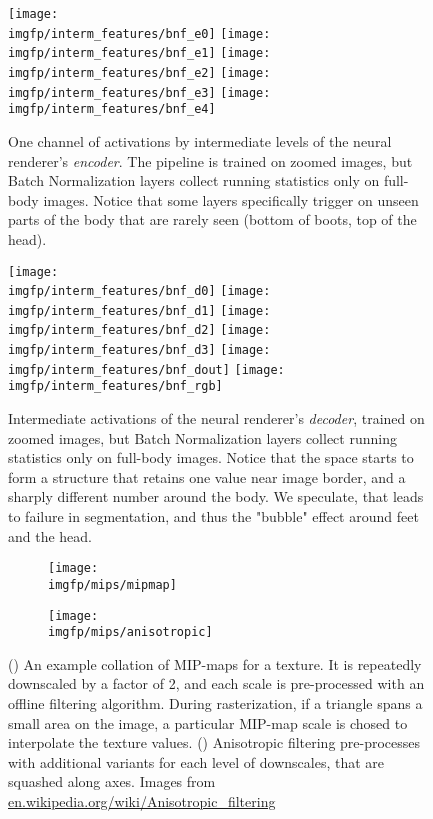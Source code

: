 \begin{figure}
	\centering
	\texttt{[image: \\imgfp/interm\_features/bnf\_e0]}%
	\hfill\texttt{[image: \\imgfp/interm\_features/bnf\_e1]}%
	\hfill\texttt{[image: \\imgfp/interm\_features/bnf\_e2]}%
	\hfill\texttt{[image: \\imgfp/interm\_features/bnf\_e3]}%
	\hfill\texttt{[image: \\imgfp/interm\_features/bnf\_e4]}%
	\caption{One channel of activations by intermediate levels of the neural renderer's \textit{encoder}. The pipeline is trained on zoomed images, but Batch Normalization layers collect running statistics only on full-body images. Notice that some layers specifically trigger on unseen parts of the body that are rarely seen (bottom of boots, top of the head).}
	\label{fig:interm06_encoder}
\end{figure}
\begin{figure}
	\centering
	\texttt{[image: \\imgfp/interm\_features/bnf\_d0]}%
	\hfill\texttt{[image: \\imgfp/interm\_features/bnf\_d1]}%
	\hfill\texttt{[image: \\imgfp/interm\_features/bnf\_d2]}%
	\hfill\texttt{[image: \\imgfp/interm\_features/bnf\_d3]}%
	\hfill\texttt{[image: \\imgfp/interm\_features/bnf\_dout]}%
	\hfill\texttt{[image: \\imgfp/interm\_features/bnf\_rgb]}%
	\caption{Intermediate activations of the neural renderer's \textit{decoder}, trained on zoomed images, but Batch Normalization layers collect running statistics only on full-body images. Notice that the space starts to form a structure that retains one value near image border, and a sharply different number around the body. We speculate, that leads to failure in segmentation, and thus the "bubble" effect around feet and the head. }
	\label{fig:interm06_decoder}
\end{figure}
\begin{figure}
	\centering
	\begin{subfigure}[b]{0.48\textwidth}
		\centering
		\texttt{[image: \\imgfp/mips/mipmap]}%
		\caption{}
		\label{fig:mipmap}
	\end{subfigure}
	\hfill
	\begin{subfigure}[b]{0.48\textwidth}
		\centering
		\texttt{[image: \\imgfp/mips/anisotropic]}
		\caption{}
		\label{fig:anisotropic}
	\end{subfigure}
	\caption{(\protect{}) An example collation of MIP-maps for a texture. It is repeatedly downscaled by a factor of 2, and each scale is pre-processed with an offline filtering algorithm. During rasterization, if a triangle spans a small area on the image, a particular MIP-map scale is chosed to interpolate the texture values. (\protect{}) Anisotropic filtering pre-processes with additional variants for each level of downscales, that are squashed along axes. Images from \href{https://en.wikipedia.org/wiki/Anisotropic_filtering}{en.wikipedia.org/wiki/Anisotropic\_filtering}} 
\end{figure}
